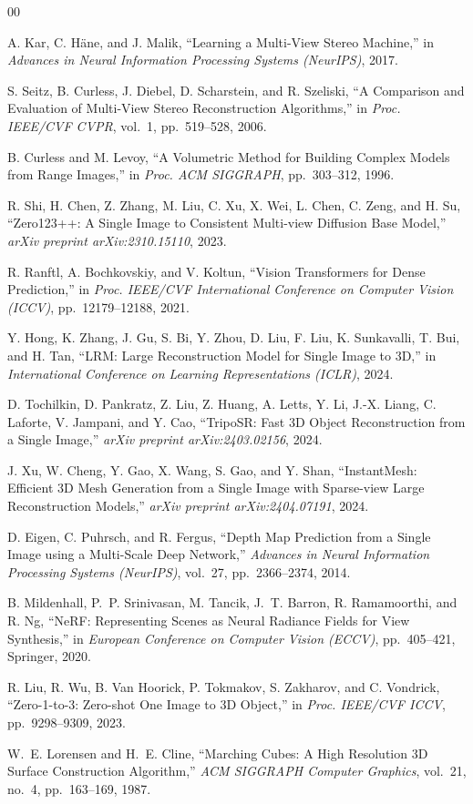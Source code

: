 ﻿\documentclass[conference]{IEEEtran}
\begin{document}
\begin{thebibliography}{00}

A. Kar, C. Häne, and J. Malik,
``Learning a Multi-View Stereo Machine,''
in \textit{Advances in Neural Information Processing Systems (NeurIPS)}, 2017.

S. Seitz, B. Curless, J. Diebel, D. Scharstein, and R. Szeliski,
``A Comparison and Evaluation of Multi-View Stereo Reconstruction Algorithms,''
in \textit{Proc. IEEE/CVF CVPR}, vol.~1, pp.~519--528, 2006.

B. Curless and M. Levoy,
``A Volumetric Method for Building Complex Models from Range Images,''
in \textit{Proc. ACM SIGGRAPH}, pp.~303--312, 1996.

R. Shi, H. Chen, Z. Zhang, M. Liu, C. Xu, X. Wei, L. Chen, C. Zeng, and H. Su,
``Zero123++: A Single Image to Consistent Multi-view Diffusion Base Model,''
\textit{arXiv preprint arXiv:2310.15110}, 2023.

R. Ranftl, A. Bochkovskiy, and V. Koltun, ``Vision Transformers for Dense Prediction,''
in \textit{Proc. IEEE/CVF International Conference on Computer Vision (ICCV)}, pp.~12179--12188, 2021.

Y. Hong, K. Zhang, J. Gu, S. Bi, Y. Zhou, D. Liu, F. Liu, K. Sunkavalli, T. Bui, and H. Tan,
``LRM: Large Reconstruction Model for Single Image to 3D,''
in \textit{International Conference on Learning Representations (ICLR)}, 2024.

D. Tochilkin, D. Pankratz, Z. Liu, Z. Huang, A. Letts, Y. Li, J.-X. Liang, C. Laforte, V. Jampani,
and Y. Cao,
``TripoSR: Fast 3D Object Reconstruction from a Single Image,''
\textit{arXiv preprint arXiv:2403.02156}, 2024.

J. Xu, W. Cheng, Y. Gao, X. Wang, S. Gao, and Y. Shan,
``InstantMesh: Efficient 3D Mesh Generation from a Single Image with Sparse-view Large Reconstruction Models,''
\textit{arXiv preprint arXiv:2404.07191}, 2024.

D. Eigen, C. Puhrsch, and R. Fergus, ``Depth Map Prediction from a Single Image using a Multi-Scale Deep Network,''
\textit{Advances in Neural Information Processing Systems (NeurIPS)}, vol.~27, pp.~2366--2374, 2014.

B. Mildenhall, P.~P. Srinivasan, M. Tancik, J.~T. Barron, R. Ramamoorthi, and R. Ng,
``NeRF: Representing Scenes as Neural Radiance Fields for View Synthesis,''
in \textit{European Conference on Computer Vision (ECCV)}, pp.~405--421, Springer, 2020.

R. Liu, R. Wu, B. Van Hoorick, P. Tokmakov, S. Zakharov, and C. Vondrick,
``Zero-1-to-3: Zero-shot One Image to 3D Object,''
in \textit{Proc. IEEE/CVF ICCV}, pp.~9298--9309, 2023.

W.~E. Lorensen and H.~E. Cline,
``Marching Cubes: A High Resolution 3D Surface Construction Algorithm,''
\textit{ACM SIGGRAPH Computer Graphics}, vol.~21, no.~4, pp.~163--169, 1987.

\end{thebibliography}
\end{document}

